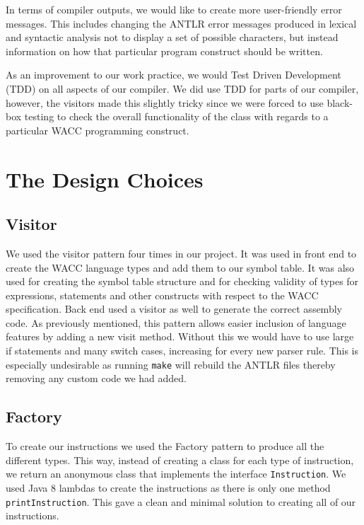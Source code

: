\documentclass[11pt,a4paper]{article}
\begin{document}
In terms of compiler outputs, we would like to create more user-friendly error messages. This includes changing the ANTLR error messages produced in lexical and syntactic analysis not to display a set of possible characters, but instead information on how that particular program construct should be written.

As an improvement to our work practice, we would Test Driven Development (TDD) on all aspects of our compiler. We did use TDD for parts of our compiler, however, the visitors made this slightly tricky since we were forced to use black-box testing to check the overall functionality of the class with regards to a particular WACC programming construct.

\section{The Design Choices}
\label{sec:The Design Choices}

\subsection{Visitor}
\label{sub:Visitor}
We used the visitor pattern four times in our project. It was used in front end to create the WACC language types and add them to our symbol table. It was also used for creating the symbol table structure and for checking validity of types for expressions, statements and other constructs with respect to the WACC specification. Back end used a visitor as well to generate the correct assembly code. As previously mentioned, this pattern allows easier inclusion of language features by adding a new visit method. Without this we would have to use large if statements and many switch cases, increasing for every new parser rule. This is especially undesirable as running \texttt{make} will rebuild the ANTLR files thereby removing any custom code we had added.

\subsection{Factory}
\label{sub:Factory}
To create our instructions we used the Factory pattern to produce all the different types. This way, instead of creating a class for each type of instruction, we return an anonymous class that implements the interface \texttt{Instruction}. We used Java 8 lambdas to create the instructions as there is only one method \texttt{printInstruction}. This gave a clean and minimal solution to creating all of our instructions.
\end{document}
